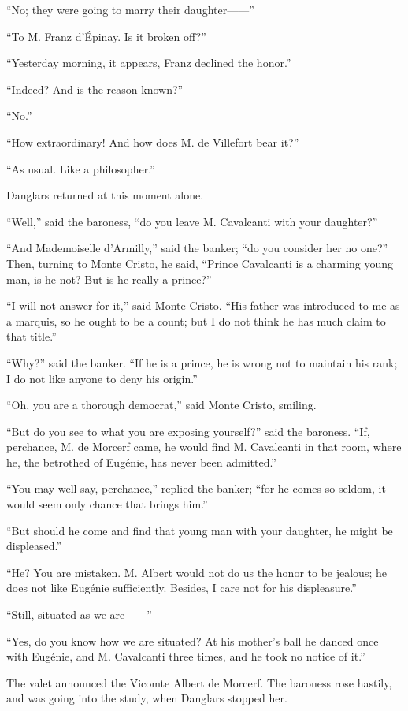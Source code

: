“No; they were going to marry their daughter——”

“To M. Franz d’Épinay. Is it broken off?”

“Yesterday morning, it appears, Franz declined the honor.”

“Indeed? And is the reason known?”

“No.”

“How extraordinary! And how does M. de Villefort bear it?”

“As usual. Like a philosopher.”

Danglars returned at this moment alone.

“Well,” said the baroness, “do you leave M. Cavalcanti with your
daughter?”

“And Mademoiselle d’Armilly,” said the banker; “do you consider her no
one?” Then, turning to Monte Cristo, he said, “Prince Cavalcanti is a
charming young man, is he not? But is he really a prince?”

“I will not answer for it,” said Monte Cristo. “His father was
introduced to me as a marquis, so he ought to be a count; but I do not
think he has much claim to that title.”

“Why?” said the banker. “If he is a prince, he is wrong not to maintain
his rank; I do not like anyone to deny his origin.”

“Oh, you are a thorough democrat,” said Monte Cristo, smiling.

“But do you see to what you are exposing yourself?” said the baroness.
“If, perchance, M. de Morcerf came, he would find M. Cavalcanti in that
room, where he, the betrothed of Eugénie, has never been admitted.”

“You may well say, perchance,” replied the banker; “for he comes so
seldom, it would seem only chance that brings him.”

“But should he come and find that young man with your daughter, he
might be displeased.”

“He? You are mistaken. M. Albert would not do us the honor to be
jealous; he does not like Eugénie sufficiently. Besides, I care not for
his displeasure.”

“Still, situated as we are——”

“Yes, do you know how we are situated? At his mother’s ball he danced
once with Eugénie, and M. Cavalcanti three times, and he took no notice
of it.”

The valet announced the Vicomte Albert de Morcerf. The baroness rose
hastily, and was going into the study, when Danglars stopped her.

